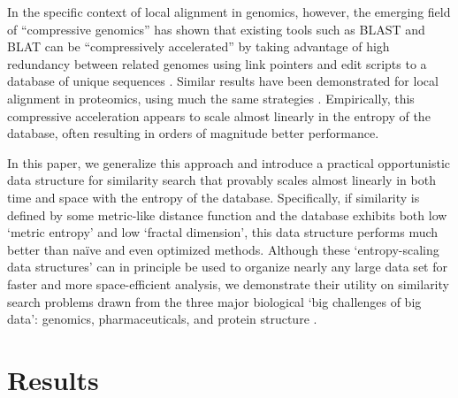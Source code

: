 \documentclass[review,preprint,12pt]{elsarticle}
\renewcommand{\cite}{\citep} %
\theoremstyle{definition}
\theoremstyle{remark}
\numberwithin{equation}{section}
\begin{document}
In the specific context of local alignment in genomics, however, the emerging field of ``compressive genomics'' has shown that existing tools such as BLAST and BLAT can be ``compressively accelerated'' by taking advantage of high redundancy between related genomes using link pointers and edit scripts to a database of unique sequences \cite{loh2012compressive}.
Similar results have been demonstrated for local alignment in proteomics, using much the same strategies \cite{daniels2013compressive}.
Empirically, this compressive acceleration appears to scale almost linearly in the entropy of the database, often resulting in orders of magnitude better performance.

In this paper, we generalize this approach and introduce a practical opportunistic data structure for similarity search that provably scales almost linearly in both time and space with the entropy of the database.
Specifically, if similarity is defined by some metric-like distance function and the database exhibits both low `metric entropy' and low `fractal dimension', this data structure performs much better than na\"ive and even optimized methods.
Although these `entropy-scaling data structures' can in principle be used to organize nearly any large data set for faster and more space-efficient analysis,
we demonstrate their utility on similarity search problems drawn from the three major biological `big challenges of big data': genomics, pharmaceuticals, and protein structure \cite{marx2013biology}.

\section{Results}
\end{document}
